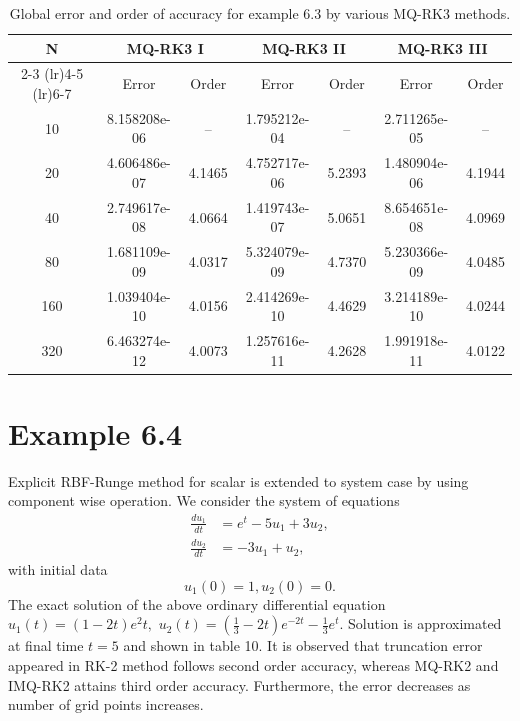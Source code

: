 \documentclass[a4paper, preprint,11pt]{elsarticle}
\numberwithin{equation}{section}
\begin{document}
\begin{table}[htbp!]
    \centering
    \caption{Global error and order of accuracy for example 6.3 by various MQ-RK3 methods.}
    \begin{tabular}{c c c c c c c}
        \toprule
        N & \multicolumn{2}{c}{MQ-RK3 I}  & \multicolumn{2}{c}{MQ-RK3 II} & \multicolumn{2}{c}{MQ-RK3 III} \\
        \cmidrule(lr){2-3} \cmidrule(lr){4-5}  \cmidrule(lr){6-7}
          & Error & Order & Error & Order & Error & Order \\
        \midrule
        10  & 8.158208e-06   & -- &1.795212e-04 & -- & 2.711265e-05       & --    \\
        20  & 4.606486e-07    & 4.1465 &  4.752717e-06  & 5.2393&  1.480904e-06   &  4.1944 \\
        40  &2.749617e-08    &   4.0664& 1.419743e-07  & 5.0651 & 8.654651e-08   &  4.0969 \\
        80  &1.681109e-09    &   4.0317 & 5.324079e-09 &  4.7370 &  5.230366e-09  & 4.0485 \\
        160 & 1.039404e-10  &  4.0156& 2.414269e-10&   4.4629 & 3.214189e-10     & 4.0244\\
        320 &  6.463274e-12 & 4.0073 &1.257616e-11  &  4.2628 & 1.991918e-11  &  4.0122\\
        \bottomrule
    \end{tabular}
\end{table}
\section*{Example 6.4}
Explicit RBF-Runge method for scalar is extended to system case by using component wise operation. We consider the system of equations  
\begin{equation*}
\begin{aligned}
 \frac{du_1}{dt}  & =  e^t - 5u_1 + 3u_2,\\
 \frac{du_2}{dt}  & = -3u_1 + u_2,
\end{aligned}
\end{equation*}
with initial data
\begin{equation*}
     u_1(0) = 1, u_2(0) = 0.
\end{equation*}
The exact solution of the above ordinary differential equation $u
_1(t) = (1-2t)e^2t,\,\, u_2(t) = (\frac{1}{3} - 2t)e^{-2t} - \frac{1}{3}e^t$. Solution is approximated at final time $t = 5$ and shown in table 10. It is observed that truncation error appeared in RK-2 method follows second order accuracy, whereas MQ-RK2 and IMQ-RK2 attains third order accuracy. Furthermore, the error decreases as number of grid points increases.
\end{document}
